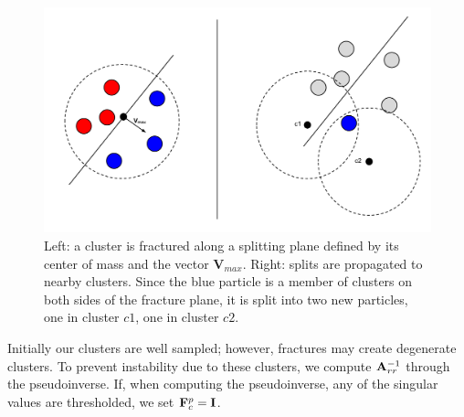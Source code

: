 \documentclass[conference]{acmsiggraph}
\begin{document}
\begin{figure}
\includegraphics[width=0.825\linewidth]{Figures/fractureFigure}
\caption{Left: a cluster is fractured along a splitting plane defined by its center of mass and the vector $\mathbf{V}_{max}$.  Right: splits are propagated to nearby clusters.   Since the blue particle is a member of clusters on both sides of the fracture plane, it is split into two new particles, one in cluster $c1$, one in cluster $c2$.  }
\label{fig:fractureFig}
\end{figure}



Initially our clusters are well sampled; however, fractures may create degenerate clusters.  To prevent instability due to these clusters, we compute $\mathit{\mathbf{A}}_{rr}^{-1}$
through the pseudoinverse.  If, when computing the pseudoinverse, any of the singular values are thresholded,
we set $\mathit{\mathbf{F}}_c^p = \mathit{\mathbf{I}}$.  
\end{document}
